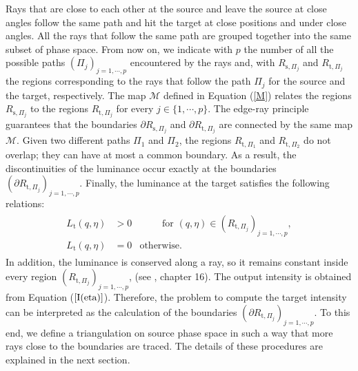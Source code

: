 Rays that are close to each other at the source and leave the source at close angles follow the same path and hit the target at close positions and under close angles.
All the rays that follow the same path are grouped together into the same subset of phase space.
 From now on, we indicate with $p$ the number of all the possible paths $(\Pi_{j})_{j = 1, \cdots, p}$ encountered by the rays
  and, with $R_{\textrm{s}, \Pi_j}$ and $R_{\textrm{t}, \Pi_j}$ the regions corresponding to the rays that follow the path $\Pi_j$ for the source and the target, respectively.
  The map $\mathcal{M}$ defined in Equation (\ref{M}) relates the regions $R_{\textrm{s}, \Pi_j}$ to the regions $R_{\textrm{t}, \Pi_j}$ for every $j \in \{1, \cdots,p \}$.
The edge-ray principle guarantees that the boundaries $\partial R_{\textrm{s}, \Pi_j}$ and $\partial R_{\textrm{t}, \Pi_j}$ are connected by the same map $\mathcal{M}$.
Given two different paths $\Pi_1$ and $\Pi_2$, the regions $R_{\textrm{t}, \Pi_1}$ and $R_{\textrm{t}, \Pi_2}$ do not overlap; they can have at most a common boundary.
As a result, the discontinuities of the luminance occur exactly at the boundaries $(\partial R_{\textrm{t}, \Pi_j})_{j = 1,\cdots, p}$.
Finally, the luminance at the target satisfies the following relations:
\begin{equation}
\begin{array}{cc}
\begin{aligned}
 \label{luminance}
L_\textrm{t}(q, \eta) &> 0  &\qquad \mbox{ for } (q, \eta)\in (R_{\textrm{t}, \Pi_j})_{j = 1, \cdots, p}, \\
L_\textrm{t}(q, \eta) &= 0 &\mbox{otherwise}. \qquad \qquad \qquad \;\;\,
\end{aligned}
\end{array}
\end{equation}
In addition, the luminance is conserved along a ray, so it remains constant inside every region $ (R_{\textrm{t}, \Pi_j})_{j  =1, \cdots, p }$, (see \cite{chaves2008introduction}, chapter 16).
The output intensity is obtained from Equation ($\ref{I(eta)}$).
Therefore, the problem to compute the target intensity can be interpreted as the calculation of the boundaries $(\partial R_{\textrm{t}, \Pi_j})_{j = 1,\cdots, p}$.
To this end, we define a triangulation on source phase space in such a way that more rays close to the boundaries are traced.
The details of these procedures are explained in the next section.

